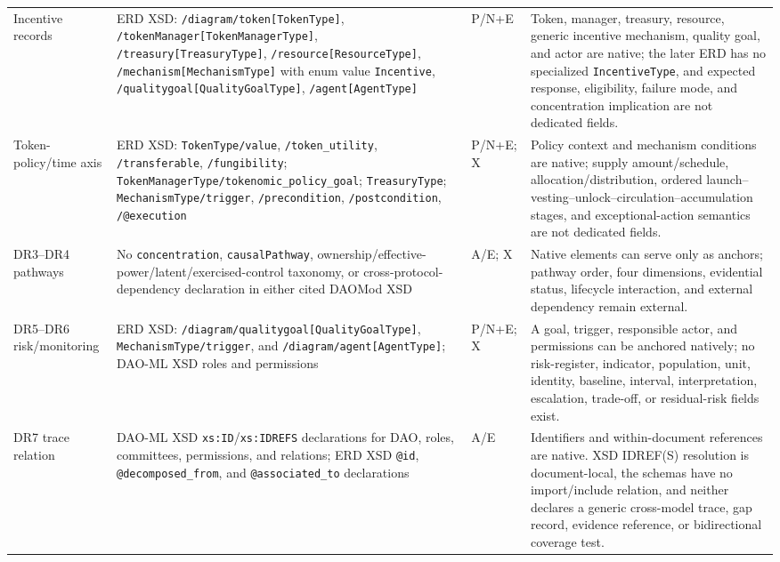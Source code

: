\documentclass[10pt]{article}
\begin{document}
\begin{landscape}
{\begin{longtable}{@{}p{.13\linewidth}p{.37\linewidth}p{.15\linewidth}p{.27\linewidth}@{}}
Incentive records & ERD XSD: \texttt{/diagram/token[TokenType]}, \texttt{/tokenManager[TokenManagerType]}, \texttt{/treasury[TreasuryType]}, \texttt{/resource[ResourceType]}, \texttt{/mechanism[MechanismType]} with enum value \texttt{Incentive}, \texttt{/qualitygoal[QualityGoalType]}, \texttt{/agent[AgentType]} & P/N+E & Token, manager, treasury, resource, generic incentive mechanism, quality goal, and actor are native; the later ERD has no specialized \texttt{IncentiveType}, and expected response, eligibility, failure mode, and concentration implication are not dedicated fields. \\
Token-policy/time axis & ERD XSD: \texttt{TokenType/value}, \texttt{/token\_utility}, \texttt{/transferable}, \texttt{/fungibility}; \texttt{TokenManagerType/tokenomic\_policy\_goal}; \texttt{TreasuryType}; \texttt{MechanismType/trigger}, \texttt{/precondition}, \texttt{/postcondition}, \texttt{/@execution} & P/N+E; X & Policy context and mechanism conditions are native; supply amount/schedule, allocation/distribution, ordered launch--vesting--unlock--circulation--accumulation stages, and exceptional-action semantics are not dedicated fields. \\
DR3--DR4 pathways & No \texttt{concentration}, \texttt{causalPathway}, ownership/effective-power/latent/exercised-control taxonomy, or cross-protocol-dependency declaration in either cited DAOMod XSD & A/E; X & Native elements can serve only as anchors; pathway order, four dimensions, evidential status, lifecycle interaction, and external dependency remain external. \\
DR5--DR6 risk/monitoring & ERD XSD: \texttt{/diagram/qualitygoal[QualityGoalType]}, \texttt{MechanismType/trigger}, and \texttt{/diagram/agent[AgentType]}; DAO-ML XSD roles and permissions & P/N+E; X & A goal, trigger, responsible actor, and permissions can be anchored natively; no risk-register, indicator, population, unit, identity, baseline, interval, interpretation, escalation, trade-off, or residual-risk fields exist. \\
DR7 trace relation & DAO-ML XSD \texttt{xs:ID}/\texttt{xs:IDREFS} declarations for DAO, roles, committees, permissions, and relations; ERD XSD \texttt{@id}, \texttt{@decomposed\_from}, and \texttt{@associated\_to} declarations & A/E & Identifiers and within-document references are native. XSD IDREF(S) resolution is document-local, the schemas have no import/include relation, and neither declares a generic cross-model trace, gap record, evidence reference, or bidirectional coverage test. \\
\bottomrule
\end{longtable}
}
\end{landscape}
\end{document}
